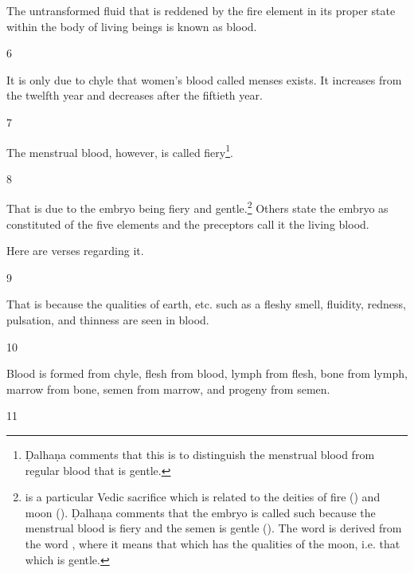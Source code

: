\begin{translation}
\begin{sloka}
The untransformed fluid that is reddened by the fire element in its proper state within the body of living beings is known as blood. %
\end{sloka}

\item [6]

\begin{sloka}
It is only due to chyle that women's blood called menses exists. It increases from the twelfth year and decreases after the fiftieth year. 
\end{sloka}

\item [7]

The menstrual blood, however, is called fiery\footnote{Ḍalhaṇa comments that this is to distinguish the menstrual blood from regular blood that is gentle.}.  

\item [8]

That is due to the embryo being fiery and gentle.\footnote{ is a particular Vedic sacrifice which is related to the deities of fire () and moon (). Ḍalhaṇa comments that the embryo is called such because the menstrual blood is fiery and the semen is gentle (). The word  is derived from the word , where it means that which has the qualities of the moon, i.e. that which is gentle.}
Others state the embryo as constituted of the five elements and the preceptors call it the living blood. 

Here are verses regarding it.

\item [9]

\begin{sloka}
That is because the qualities of earth, etc. such as a fleshy smell, fluidity, redness, pulsation, and thinness are seen in blood.
\end{sloka}

\item [10]

\begin{sloka}
Blood is formed from chyle, flesh from blood, lymph from flesh, bone from lymph, marrow from bone, semen from marrow, and progeny from semen. 
\end{sloka}

\item [11]


\end{translation}

